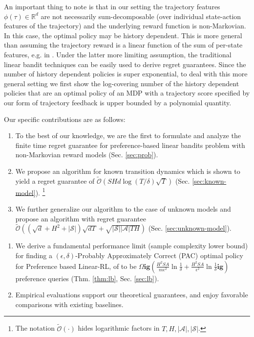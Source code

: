 An important thing to note is that in our setting the trajectory features $\phi(\tau) \in {\mathbb R}^d$ are not necessarily  sum-decomposable (over individual state-action features of the trajectory) and the underlying reward function is non-Markovian. In this case, the optimal policy may be history dependent. This is more general than assuming the trajectory reward is a linear function of the sum of per-state features, e.g. in \cite{sui19}. Under the latter more limiting assumption, the traditional linear bandit techniques can be easily used to derive regret guarantees. Since the number of history dependent policies is super exponential, to deal with this more general setting we first show the log-covering number of the history dependent policies that are an optimal policy of an MDP with a trajectory score specified by our form of trajectory feedback is upper bounded by a polynomial quantity. 

Our specific contributions are as follows:

\begin{enumerate}
	\item To the best of our knowledge, we are the first to formulate and analyze the finite time regret guarantee for preference-based linear bandits problem with non-Markovian reward models (Sec. \ref{sec:prob}). 

	\item We propose an algorithm for known transition dynamics which is shown to yield a regret guarantee of $\tilde {\mathcal{O}}\left( S H d  \log (T / \delta) \sqrt{T}  \right)$ (Sec. \ref{sec:known-model}). \footnote{The notation $\widetilde{\mathcal{O}}(\cdot)$ hides logarithmic factors in $T, H, |\mathcal{A}|, |\mathcal{S}|$.} 

	\item We further generalize our algorithm to the case of unknown models and propose an algorithm with regret guarantee $\widetilde{\mathcal{O}}((\sqrt{d} + H^2 + |\mathcal{S}|)\sqrt{dT} +\sqrt{|\mathcal{S}||\mathcal{A}|TH} )$ (Sec. \ref{sec:unknown-model}).
\end{enumerate}

\iffalse

\begin{enumerate}

	\item We derive a fundamental performance limit (sample complexity lower bound) for finding a $(\epsilon,\delta)$-Probably Approximately Correct (PAC) optimal policy for Preference based Linear-RL, of to be $\Omega\mathbf{ig}( \frac{H^2 S A}{m \epsilon^2}\ln \frac{1}{\delta}+ \frac{H^2 S A}{\epsilon^2}\ln \frac{1}{\delta}\mathbf{ig})$ preference queries (Thm. \ref{thm:lb}, Sec. \ref{sec:lb}). 

	\item Empirical evaluations   support our theoretical guarantees, and enjoy favorable comparisons with existing baselines. 
\end{enumerate}

